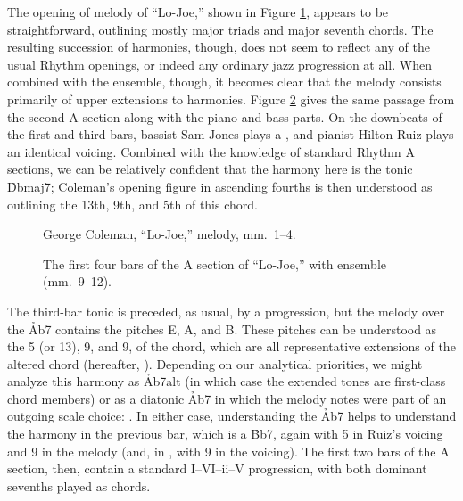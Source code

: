 The opening of melody of ``Lo-Joe,'' shown in Figure \ref{lj:opening-melody},
appears to be straightforward, outlining mostly major triads and major seventh
chords. The resulting succession of harmonies, though, does not seem to
reflect any of the usual Rhythm openings, or indeed any ordinary jazz
progression at all. When combined with the ensemble, though, it becomes clear
that the melody consists primarily of upper extensions to harmonies. Figure
\ref{lj:opening-ens} gives the same passage from the second A section along
with the piano and bass parts. On the downbeats of the first and
third bars, bassist Sam Jones plays a \Dflat, and pianist Hilton Ruiz plays an
identical voicing. Combined with the knowledge of standard Rhythm A sections,
we can be relatively confident that the harmony here is the tonic \h{Dbmaj7};
Coleman's opening figure in ascending fourths is then understood as outlining
the 13th, 9th, and 5th of this chord.

\begin{figure}[tbp]
  \caption{George Coleman, ``Lo-Joe,'' melody, mm.~1--4.}
  \label{lj:opening-melody}
\end{figure}

\begin{figure}[tbp]
  \caption[The first four bars of the A section of ``Lo-Joe,'' with
  ensemble.]{%
    The first four bars of the A section of ``Lo-Joe,'' with ensemble
    (mm.~9--12).}
  \label{lj:opening-ens}
\end{figure}

The third-bar tonic is preceded, as usual, by a \tf progression, but the
melody over the \h{Ab7} contains the pitches E\nat, A\nat, and B\nat. These
pitches can be understood as the \sharp{}5 (or \flat{}13), \flat{}9, and
\sharp{}9, of the chord, which are all representative extensions of the
altered chord (hereafter, \alt). Depending on our analytical
priorities, we might analyze this harmony as \h{Ab7alt} (in which case the
extended tones are first-class chord members) or as a diatonic \h{Ab7} in
which the melody notes were part of an outgoing scale choice:
. In either case, understanding the \h{Ab7} helps to
understand the harmony in the previous bar, which is a \h{Bb7}, again with
\sharp{}5 in Ruiz's voicing and \flat{}9 in the melody (and, in ,
with \sharp{}9 in the voicing). The first two bars of the A section, then,
contain a standard I--VI--ii--V progression, with both dominant sevenths
played as \alt chords.

